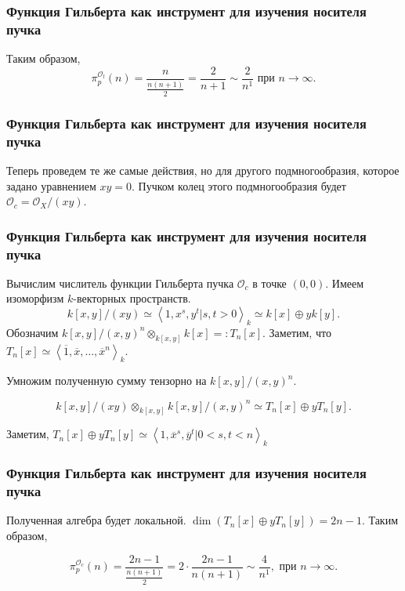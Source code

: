 \documentclass{beamer}
\newcommand{\ox}{\otimes}
\newcommand{\OO}{\mathcal{O}}
\renewcommand{\bar}[1]{\overline{#1}}
\begin{document}
    \begin{frame}
        \frametitle{Функция Гильберта как инструмент для изучения носителя пучка}

        Таким образом,
        \begin{equation*}
            \pi^{\OO_l}_p(n) = \frac{n}{\frac{n(n + 1)}{2}} = \frac{2}{n + 1} \sim \frac{2}{n^1} \text{ при $n \rightarrow \infty$}.
        \end{equation*}
    \end{frame}

    \begin{frame}
        \frametitle{Функция Гильберта как инструмент для изучения носителя пучка}

        Теперь проведем те же самые действия, но для другого подмногообразия, которое задано уравнением $xy = 0$.
        Пучком колец этого подмногообразия будет $\OO_c = \OO_X / (xy)$.
    \end{frame}

    \begin{frame}
        \frametitle{Функция Гильберта как инструмент для изучения носителя пучка}

        Вычислим числитель функции Гильберта пучка $\OO_c$ в точке $(0, 0)$. Имеем изоморфизм $k$-векторных пространств. 
        \begin{equation*}
            k[x, y] / (xy) \simeq \left<1, x^s, y^t | s, t > 0 \right>_k \simeq k[x] \oplus yk[y].
        \end{equation*}
        Обозначим $k[x, y] / (x, y)^n \ox_{k[x, y]} k[x] =: T_n[x]$.
        Заметим, что $T_n[x] \simeq \left< \bar{1}, \bar{x}, \dots, \bar{x}^n \right>_k$.
        
        Умножим полученную сумму тензорно на $k[x, y] / (x, y)^n$.

        \begin{equation*}
            k[x, y] / (xy) \ox_{k[x, y]} k[x, y] / (x, y)^n \simeq T_n[x] \oplus yT_n[y].
        \end{equation*}

        Заметим, $T_n[x] \oplus yT_n[y] \simeq \left<1, \bar{x}^s, \bar{y}^t | 0 < s, t < n \right>_k$
    \end{frame}

    \begin{frame}
        \frametitle{Функция Гильберта как инструмент для изучения носителя пучка}
    
        Полученная алгебра будет локальной. $\dim (T_n[x] \oplus yT_n[y]) = 2n - 1$. Таким образом,

        \begin{equation}
            \pi^{\OO_c}_p(n) = \frac{2n - 1}{\frac{n(n + 1)}{2}} = 2 \cdot \frac{2n - 1}{n(n + 1)} \sim \frac{4}{n^1}, \text{ при $n \rightarrow \infty$.}
        \end{equation}
    \end{frame}
    
\end{document}
